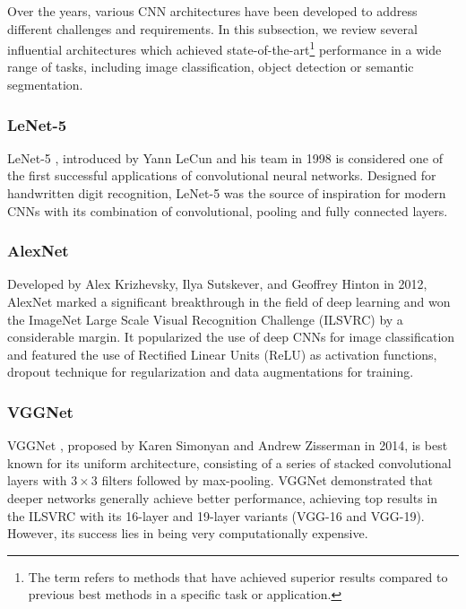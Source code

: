 
Over the years, various CNN architectures have been developed to address
different challenges and requirements. In this subsection, we review several
influential architectures which achieved state-of-the-art\footnote{The term
 refers to methods that have achieved superior results
compared to previous best methods in a specific task or application.}
performance in a wide range of tasks, including image classification, object
detection or semantic segmentation.


\subsubsection{LeNet-5}

LeNet-5 \cite{Lecun1998}, introduced by Yann LeCun and his team in 1998 is
considered one of the first successful applications of convolutional neural
networks.  Designed for handwritten digit recognition, LeNet-5 was the source of
inspiration for modern CNNs with its combination of convolutional, pooling and
fully connected layers.


\subsubsection{AlexNet}

Developed by Alex Krizhevsky, Ilya Sutskever, and Geoffrey Hinton in 2012,
AlexNet \cite{NIPS2012} marked a significant breakthrough in the field of deep
learning and won the ImageNet Large Scale Visual Recognition Challenge (ILSVRC)
by a considerable margin. It popularized the use of deep CNNs for image
classification and featured the use of Rectified Linear Units (ReLU) as
activation functions, dropout technique for regularization and data
augmentations for training.


\subsubsection{VGGNet}

VGGNet \cite{Simonyan2014}, proposed by Karen Simonyan and Andrew Zisserman in
2014, is best known for its uniform architecture, consisting of a series of
stacked convolutional layers with $3 \times 3$ filters followed by max-pooling.
VGGNet demonstrated that deeper networks generally achieve better performance,
achieving top results in the ILSVRC with its 16-layer and 19-layer variants
(VGG-16 and VGG-19). However, its success lies in being very computationally
expensive.


